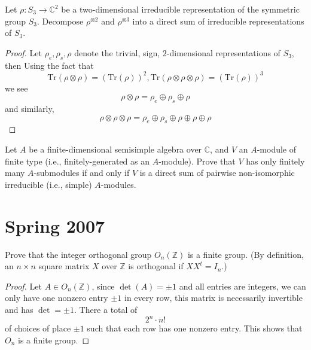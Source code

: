 \documentclass[openany]{book}
\newcommand{\Z}{\mathbb{Z}}
\begin{document}
\begin{prob}
    Let \(\rho:S_3\to\mathbb{C}^2\) be a two-dimensional irreducible representation of the symmetric group \(S_3\). Decompose \(\rho^{\otimes 2}\) and \(\rho^{\otimes 3}\) into a direct sum of irreducible representations of \(S_3\).
\end{prob}
\begin{proof}
    Let $\rho_e, \rho_s, \rho$ denote the trivial, sign, $2$-dimensional representations of $S_3$, then
    Using the fact that 
    \begin{equation*}
        \text{Tr}(\rho\otimes\rho)=(\text{Tr}(\rho))^2, \text{Tr}(\rho\otimes\rho\otimes\rho)=(\text{Tr}(\rho))^3
    \end{equation*}
    we see 
    \begin{equation*}
        \rho\otimes\rho= \rho_e\oplus\rho_s\oplus\rho
    \end{equation*}
    and similarly, 
    \begin{equation*}
        \rho\otimes\rho\otimes\rho=\rho_{e}\oplus\rho_s\oplus\rho\oplus\rho\oplus\rho
    \end{equation*}
\end{proof}


\begin{prob}
    Let \(A\) be a finite-dimensional semisimple algebra over \(\mathbb{C}\), and \(V\) an \(A\)-module of finite type (i.e., finitely-generated as an \(A\)-module). Prove that \(V\) has only finitely many \(A\)-submodules if and only if \(V\) is a direct sum of pairwise non-isomorphic irreducible (i.e., simple) \(A\)-modules.
\end{prob}







\chapter{Spring 2007}



\begin{prob}
    Prove that the integer orthogonal group \(O_n(\mathbb{Z})\) is a finite group. (By definition, an \(n \times n\) square matrix \(X\) over \(\mathbb{Z}\) is orthogonal if \(XX^t = I_n\).)
\end{prob}
\begin{proof}
    Let $A\in O_n(\Z)$, since $\det(A)=\pm 1$ and all entries are integers, we can only have one nonzero entry $\pm 1$ in every row, this matrix is necessarily invertible and has $\det=\pm 1$. There a total of 
    \begin{equation*}
        2^n\cdot n!
    \end{equation*}
    of choices of place $\pm1$ such that each row has one nonzero entry. This shows that $O_n$ is a finite group.
\end{proof}
\end{document}
